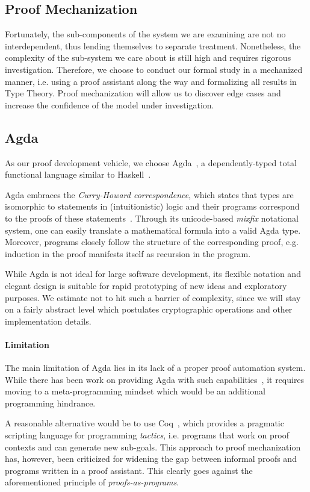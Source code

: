 \documentclass[acmsmall,nonacm=true,screen=true]{acmart}
\begin{document}
\subsection{Proof Mechanization}
Fortunately, the sub-components of the system we are examining are not no interdependent,
thus lending themselves to separate treatment.
Nonetheless, the complexity of the sub-system we care about is still high and requires rigorous investigation.
Therefore, we choose to conduct our formal study in a mechanized manner, i.e. using a proof assistant
along the way and formalizing all results in Type Theory.
Proof mechanization will allow us to discover edge cases and increase the confidence of the model under investigation.

\subsection{Agda}
As our proof development vehicle, we choose Agda~\cite{agda}, a dependently-typed total functional language
similar to Haskell~\cite{haskell}.

Agda embraces the \textit{Curry-Howard correspondence}, which states that types are isomorphic to statements in
(intuitionistic) logic and their programs correspond to the proofs of these statements~\cite{itt}.
Through its unicode-based \textit{mixfix} notational system, one can easily translate a mathematical formula
into a valid Agda type. Moreover, programs closely follow the structure of the corresponding proof, e.g. induction
in the proof manifests itself as recursion in the program.

While Agda is not ideal for large software development, its flexible notation
and elegant design is suitable for rapid prototyping of new ideas and exploratory purposes.
We estimate not to hit such a barrier of complexity,
since we will stay on a fairly abstract level which postulates cryptographic operations and other implementation details.

\paragraph{Limitation}
The main limitation of Agda lies in its lack of a proper proof automation system.
While there has been work on providing Agda with such capabilities~\cite{agdaauto},
it requires moving to a meta-programming mindset which would be an additional programming hindrance.

A reasonable alternative would be to use Coq~\cite{coq}, which provides a pragmatic
scripting language for programming \textit{tactics}, i.e. programs that work on proof contexts and can
generate new sub-goals.
This approach to proof mechanization has, however, been criticized for widening the gap between informal proofs
and programs written in a proof assistant.
This clearly goes against the aforementioned principle of \textit{proofs-as-programs}.
\end{document}
